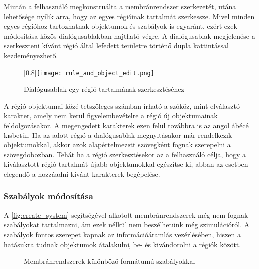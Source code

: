 Miután a felhasználó megkonstruálta a membránrendszer szerkezetét, utána lehetősége nyílik arra, hogy az egyes régióinak tartalmát szerkessze. Mivel minden egyes régióhoz tartozhatnak objektumok és szabályok is egyaránt, ezért ezek módosítása közös dialógusablakban hajtható végre. A dialógusablak megjelenése a szerkeszteni kívánt régió által lefedett területre történő dupla kattintással kezdeményezhető. 

\begin{figure}[H]
	\centering
	\scalebox{0.8}[0.8]{\texttt{[image: rule\_and\_object\_edit.png]}}
	\caption{Dialógusablak egy régió tartalmának szerkesztéséhez}
	\label{fig:obj_edit}
\end{figure}

A régió objektumai közé tetszőleges számban írható a szóköz, mint elválasztó karakter, amely nem kerül figyelembevételre a régió új objektumainak feldolgozásakor. A megengedett karakterek ezen felül továbbra is az angol ábécé kisbetűi. Ha az adott régió a dialógusablak megnyitásakor már rendelkezik objektumokkal, akkor azok alapértelmezett szövegként fognak szerepelni a szövegdobozban. Tehát ha a régió szerkesztésekor az a felhasználó célja, hogy a kiválasztott régió tartalmát újabb objektumokkal egészítse ki, abban az esetben elegendő a hozzáadni kívánt karakterek begépelése.

\subsubsection{Szabályok módosítása}

A \ref{fig:create_system} segítségével alkotott membránrendszerek még nem fognak szabályokat tartalmazni, ám ezek nélkül nem beszélhetünk még szimulációról.  A szabályok fontos szerepet kapnak az információáramlás vezérlésében, hiszen a hatásukra tudnak objektumok átalakulni, be- és kivándorolni a régiók között. 

\begin{figure}[H]
	\centering
	\vspace{5pt}
	\caption{Membránrendszerek különböző formátumú szabályokkal}
	\label{fig:rule_edits}
\end{figure}

